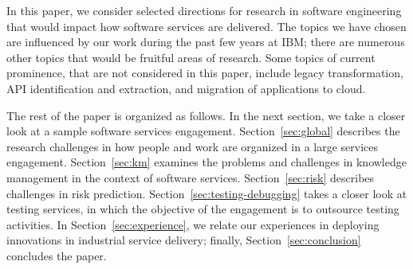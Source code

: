 
In this paper, we consider selected directions for research in software
engineering that would impact how software services are delivered.  The topics
we have chosen are influenced by our work during the past few years at IBM;
there are numerous other topics that would be fruitful areas of research.  Some
topics of current prominence, that are not considered in this paper, include
legacy transformation, API identification and extraction, and migration of
applications to cloud.


The rest of the paper is organized as follows. In the next section, we take a
closer look at a sample software services engagement.  Section~\ref{sec:global}
describes the research challenges in how people and work are organized in a
large services engagement.  Section~\ref{sec:km} examines the problems and
challenges in knowledge management in the context of software services.
Section~\ref{sec:risk} describes challenges in risk prediction.
Section~\ref{sec:testing-debugging} takes a closer look at testing services, in
which the objective of the engagement is to outsource testing activities.  In
Section~\ref{sec:experience}, we relate our experiences in deploying innovations
in industrial service delivery; finally, Section~\ref{sec:conclusion} concludes
the paper.


